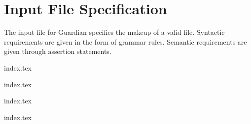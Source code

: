 
\chapter{Input File Specification}
{
	The input file for Guardian specifies the makeup of a valid file.
	Syntactic requirements are given in the form of grammar rules.
	Semantic requirements are given through assertion statements.
	
	{index.tex}
	
	{index.tex}
	
	{index.tex}
	
	{index.tex}
}

